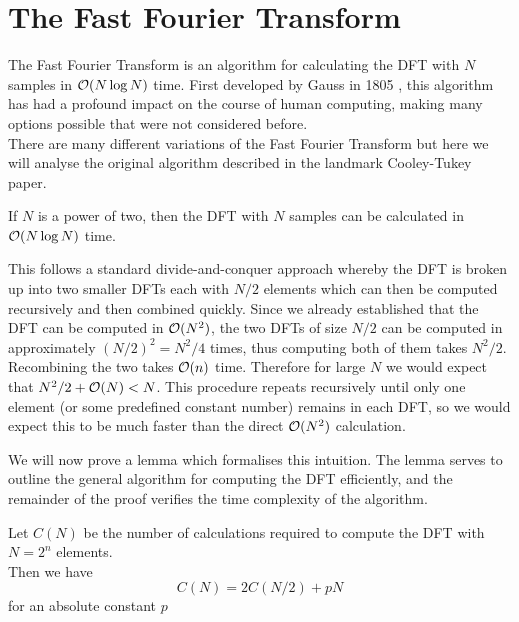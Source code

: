 \section{The Fast Fourier Transform}

The Fast Fourier Transform is an algorithm for calculating the DFT with $N$ samples in $\mathcal O(N \log N)$ time. First developed by Gauss in 1805 \cite{gauss}, this algorithm has had a profound impact on the course of human computing, making many options possible that were not considered before.\\
There are many different variations of the Fast Fourier Transform but here we will analyse the original algorithm described in the landmark Cooley-Tukey paper\cite{10.2307/2003354}.

\begin{theorem}\label{thm:fft}
    If $N$ is a power of two, then the DFT with $N$ samples can be calculated in $\mathcal O(N\log N)$ time.
\end{theorem}

This follows a standard divide-and-conquer approach whereby the DFT is broken up into two smaller DFTs each with $N/2$ elements  which can then be computed recursively and then combined quickly. Since we already established that the DFT can be computed in $\mathcal O(N^2)$, the two DFTs of size $N/2$ can be computed in approximately $(N/2)^2 = N^2/4$ times, thus computing both of them takes $N^2 / 2$. Recombining the two takes $\mathcal O(n)$ time. Therefore for large $N$ we would expect that $N^2/2 + \mathcal O(N) < N$. This procedure repeats recursively until only one element (or some predefined constant number) remains in each DFT, so we would expect this to be much faster than the direct $\mathcal O(N^2)$ calculation.

We will now prove a lemma which formalises this intuition. The lemma serves to outline the general algorithm for computing the DFT efficiently, and the remainder of the proof verifies the time complexity of the algorithm.

\begin{lemma}
    Let $C(N)$ be the number of calculations required to compute the DFT with $N = 2^n$ elements.\\
    Then we have
    \begin{equation}
        C(N) = 2 C(N/2) + pN \label{eq:fftlem}
    \end{equation}
    for an absolute constant $p$
\end{lemma}

